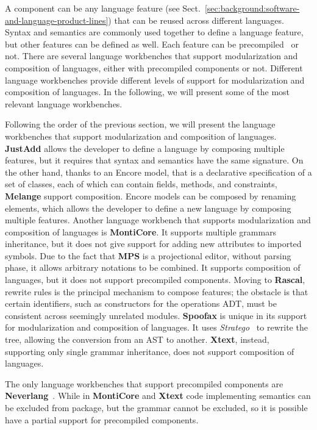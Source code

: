 A component can be any language feature (see Sect.~\ref{sec:background:software-and-language-product-lines}) that can be reused across different languages. Syntax and semantics are commonly used together to define a language feature, but other features can be defined as well. Each feature can be precompiled~\cite{Cazzola13e} or not. There are several language workbenches that support modularization and composition of languages, either with precompiled components or not. Different language workbenches provide different levels of support for modularization and composition of languages. In the following, we will present some of the most relevant language workbenches.

Following the order of the previous section, we will present the language workbenches that support modularization and composition of languages. \textbf{JustAdd} allows the developer to define a language by composing multiple features, but it requires that syntax and semantics have the same signature. On the other hand, thanks to an Encore model, that is a declarative specification of a set of classes, each of which can contain fields, methods, and constraints, \textbf{Melange} support composition. Encore models can be composed by renaming elements, which allows the developer to define a new language by composing multiple features. Another language workbench that supports modularization and composition of languages is \textbf{MontiCore}. It supports multiple grammars inheritance, but it does not give support for adding new attributes to imported symbols. Due to the fact that \textbf{MPS} is a projectional editor, without parsing phase, it allows arbitrary notations to be combined. It supports composition of languages, but it does not support precompiled components. Moving to \textbf{Rascal}, rewrite rules is the principal mechanism to compose features; the obstacle is that certain identifiers, such as constructors for the operations ADT, must be consistent across seemingly unrelated modules. \textbf{Spoofax} is unique in its support for modularization and composition of languages. It uses \textit{Stratego}~\cite{Bravenboer08} to rewrite the tree, allowing the conversion from an AST to another. \textbf{Xtext}, instead, supporting only single grammar inheritance, does not support composition of languages.

The only language workbenches that support precompiled components are \textbf{Neverlang}~\cite{Cazzola13e}. While in \textbf{MontiCore} and \textbf{Xtext} code implementing semantics can be excluded from package, but the grammar cannot be excluded, so it is possible have a partial support for precompiled components.

